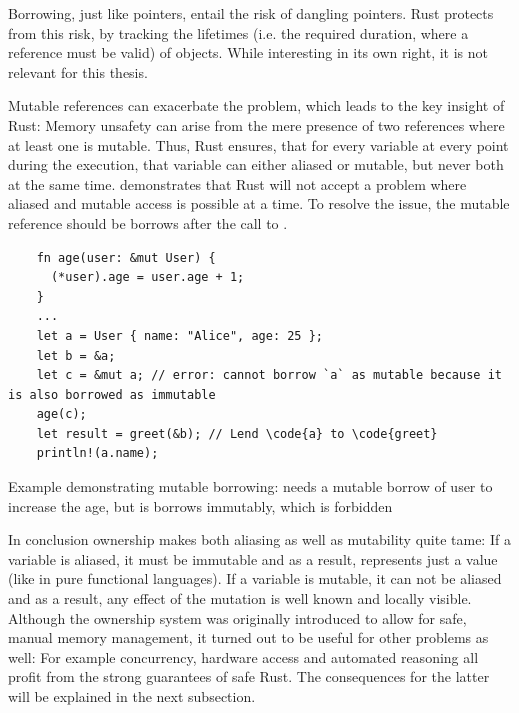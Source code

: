 \documentclass[twoside, english]{sdqthesis}
\theoremstyle{definition}
\begin{document}
Borrowing, just like pointers, entail the risk of dangling pointers. Rust protects from this risk, by tracking the lifetimes (i.e. the required duration, where a reference must be valid) of objects. While interesting in its own right, it is not relevant for this thesis.



Mutable references can exacerbate the problem, which leads to the key insight of Rust: 
Memory unsafety can arise from the mere presence of two references where at least one is mutable.
Thus, Rust ensures, that for every variable at every point during the execution, that variable can either aliased or mutable, but never both at the same time. 
 demonstrates that Rust will not accept a problem where aliased and mutable access is possible at a time. To resolve the issue, the mutable reference should be borrows after the call to .


\begin{listing}[ht]
  \begin{verbatim}
    fn age(user: &mut User) {
      (*user).age = user.age + 1;
    }
    ...
    let a = User { name: "Alice", age: 25 };
    let b = &a;
    let c = &mut a; // error: cannot borrow `a` as mutable because it is also borrowed as immutable
    age(c);
    let result = greet(&b); // Lend \code{a} to \code{greet}
    println!(a.name);
  \end{verbatim}
  \caption{Example demonstrating mutable borrowing:  needs a mutable borrow of user to increase the age, but  is borrows immutably, which is forbidden}
  \label{lst:ownership-mut-borrow}
\end{listing}

In conclusion ownership makes both aliasing as well as mutability quite tame:
If a variable is aliased, it must be immutable and as a result, represents just a value (like in pure functional languages).
If a variable is mutable, it can not be aliased and as a result, any effect of the mutation is well known and locally visible.
Although the ownership system was originally introduced to allow for safe, manual memory management, it turned out to be useful for other problems as well: For example concurrency, hardware access and automated reasoning all profit from the strong guarantees of safe Rust. The consequences for the latter will be explained in the next subsection.
\end{document}
